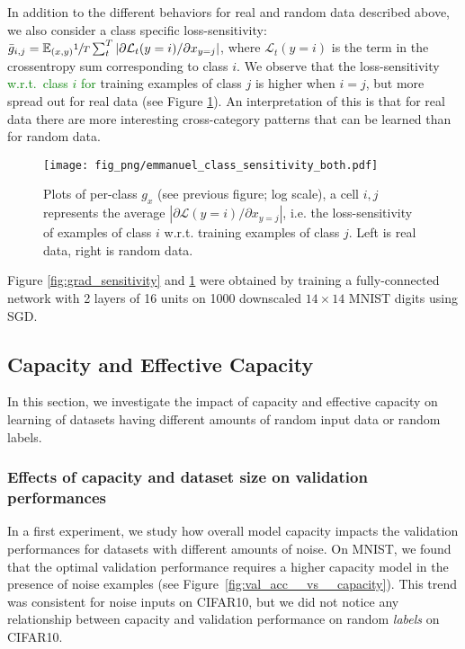 \documentclass{article}
\newcommand{\af}[1]{\textcolor{green}{#1}}
\newcommand{\af}[1]{\textcolor{black}{#1}}
\begin{document}
In addition to the different behaviors for real and random data described above, we also consider a class specific loss-sensitivity: $\bar{g}_{i, j} =\mathbb{E}_{(x,y)}\sfrac{1}{T}\sum_t^T|\partial \mathcal{L}_t(y=i)/\partial x_{y=j}|$, where $\mathcal{L}_t(y=i)$ is the term in the crossentropy sum corresponding to class $i$.
We observe that the loss-sensitivity 
\af{w.r.t.~class $i$ for}
training examples of class $j$
is higher when $i=j$, but more spread out for real data (see Figure \ref{fig:grad_class_sensitivity}).
An interpretation of this is that for real data there are more interesting cross-category patterns that can be learned than for random data.

\begin{figure}[h]
  \centering
  \hspace{-2.0em}
  \texttt{[image: fig\_png/emmanuel\_class\_sensitivity\_both.pdf]}
  \caption{Plots of per-class $g_x$ (see previous figure; log scale), a cell $i,j$ represents the average $|\partial \mathcal{L}(y=i)/\partial x_{y=j}|$, i.e. the loss-sensitivity of examples of class $i$ w.r.t. training examples of class $j$. Left is real data, right is random data.}
  \label{fig:grad_class_sensitivity}
\end{figure}

Figure \ref{fig:grad_sensitivity} and \ref{fig:grad_class_sensitivity} were obtained by training a fully-connected network with 2 layers of 16 units on 1000 downscaled $14\times 14$ MNIST digits using SGD. 


\subsection{Capacity and Effective Capacity}

In this section, we investigate the impact of capacity and effective capacity on learning of datasets having different amounts of random input data or random labels.

\subsubsection{Effects of capacity and dataset size on validation performances}

In a first experiment, we study how overall model capacity impacts the validation performances for datasets with different amounts of noise.
On MNIST, we found that the optimal validation performance requires a higher capacity model in the presence of noise examples (see Figure~\ref{fig:val_acc__vs__capacity}).
This trend was consistent for noise inputs on CIFAR10, but we did not notice any relationship between capacity and validation performance on random \emph{labels} on CIFAR10. 
\end{document}
